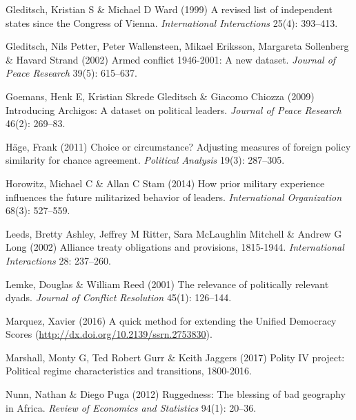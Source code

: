 \documentclass[
  11pt,
]{article}
\newlength{\cslhangindent}
\newenvironment{CSLReferences}[2] %
 {%
  \setlength{\parindent}{0pt}
  \ifodd #1 \everypar{\setlength{\hangindent}{\cslhangindent}}\ignorespaces\fi
  \ifnum #2 > 0
  \setlength{\parskip}{#2\baselineskip}
  \fi
 }%
 {}
\begin{document}
\begin{CSLReferences}{1}{0}
\leavevmode{}%
Gleditsch, Kristian S \& Michael D Ward (1999) A revised list of independent states since the {C}ongress of {V}ienna. \emph{International Interactions} 25(4): 393--413.

\leavevmode{}%
Gleditsch, Nils Petter, Peter Wallensteen, Mikael Eriksson, Margareta Sollenberg \& Havard Strand (2002) Armed conflict 1946-2001: A new dataset. \emph{Journal of Peace Research} 39(5): 615--637.

\leavevmode{}%
Goemans, Henk E, Kristian Skrede Gleditsch \& Giacomo Chiozza (2009) Introducing {A}rchigos: A dataset on political leaders. \emph{Journal of Peace Research} 46(2): 269--83.

\leavevmode{}%
Häge, Frank (2011) Choice or circumstance? Adjusting measures of foreign policy similarity for chance agreement. \emph{Political Analysis} 19(3): 287--305.

\leavevmode{}%
Horowitz, Michael C \& Allan C Stam (2014) How prior military experience influences the future militarized behavior of leaders. \emph{International Organization} 68(3): 527--559.

\leavevmode{}%
Leeds, Bretty Ashley, Jeffrey M Ritter, Sara McLaughlin Mitchell \& Andrew G Long (2002) Alliance treaty obligations and provisions, 1815-1944. \emph{International Interactions} 28: 237--260.

\leavevmode{}%
Lemke, Douglas \& William Reed (2001) The relevance of politically relevant dyads. \emph{Journal of Conflict Resolution} 45(1): 126--144.

\leavevmode{}%
Marquez, Xavier (2016) A quick method for extending the {U}nified {D}emocracy {S}cores (\url{http://dx.doi.org/10.2139/ssrn.2753830}).

\leavevmode{}%
Marshall, Monty G, Ted Robert Gurr \& Keith Jaggers (2017) Polity {IV} project: Political regime characteristics and transitions, 1800-2016.

\leavevmode{}%
Nunn, Nathan \& Diego Puga (2012) Ruggedness: The blessing of bad geography in {A}frica. \emph{Review of Economics and Statistics} 94(1): 20--36.


\end{CSLReferences}
\end{document}
